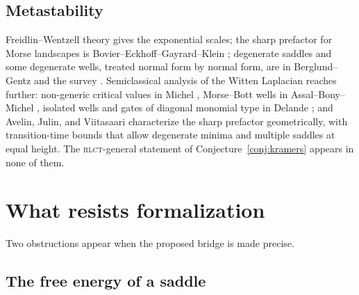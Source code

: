 \documentclass[11pt]{amsart}
\theoremstyle{plain}
\theoremstyle{definition}
\begin{document}
\subsection*{Metastability}
Freidlin--Wentzell theory \cite{freidlin2012} gives the exponential scales; the sharp prefactor for Morse landscapes is Bovier--Eckhoff--Gayrard--Klein \cite{begk2004}; degenerate saddles and some degenerate wells, treated normal form by normal form, are in Berglund--Gentz \cite{berglundgentz2010} and the survey \cite{berglund2013}. Semiclassical analysis of the Witten Laplacian reaches further: non-generic critical values in Michel \cite{michel2019}, Morse--Bott wells in Assal--Bony--Michel \cite{assal2025}, isolated wells and gates of diagonal monomial type in Delande \cite{delande2024}; and Avelin, Julin, and Viitasaari \cite{avelin2023} characterize the sharp prefactor geometrically, with transition-time bounds that allow degenerate minima and multiple saddles at equal height. The \textsc{rlct}-general statement of Conjecture~\ref{conj:kramers} appears in none of them.

\section{What resists formalization}\label{sec:resist}

Two obstructions appear when the proposed bridge is made precise.

\subsection{The free energy of a saddle}\label{sec:saddle-free-energy}
\end{document}
